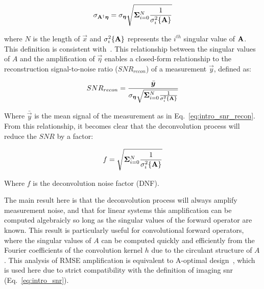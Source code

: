 \begin{equation}\label{eq:intro_noise_amplification}
    \sigma_{\mathbf{A}^{\dagger}\bm{\eta}} = \sigma_{\bm{\eta}} \sqrt{\mathbf{\Sigma}_{i=0}^N{\frac{1}{\sigma_i^2\{\mathbf{A}\}}}}
\end{equation}

\noindent where $N$ is the length of $\vec{x}$ and $\sigma_i^2 \{\mathbf{A}\}$ represents the $i^{th}$ singular value of $\mathbf{A}$. This definition is consistent with~\cite{agrawal2009optimal}. This relationship between the singular values of $A$ and the amplification of $\vec{\eta}$ enables a closed-form relationship to the reconstruction signal-to-noise ratio ($SNR_{recon}$) of a measurement $\vec{y}$, defined as:

\begin{equation}\label{eq:intro_snr_recon}
SNR_{recon} = \frac{\bar{\bm{y}}}{\sigma_{\bm{\eta}} \sqrt{\mathbf{\Sigma}_{i=0}^N{\frac{1}{\sigma_i^2\{\mathbf{A}\}}}}}
\end{equation}

Where $\bar{\vec{y}}$ is the mean signal of the measurement as in Eq.~\ref{eq:intro_snr_recon}. From this relationship, it becomes clear that the deconvolution process will reduce the $SNR$ by a factor:

\begin{equation}\label{eq:intro_dnf}
    f = \sqrt{\mathbf{\Sigma}_{i=0}^N{\frac{1}{\sigma_i^2\{\mathbf{A}\}}}}
\end{equation}

Where $f$ is the deconvolution noise factor (DNF).

The main result here is that the deconvolution process will always amplify measurement noise, and that for linear systems this amplification can be computed algebraicly so long as the singular values of the forward operator are known. This result is particularly useful for convolutional forward operators, where the singular values of $A$ can be computed quickly and efficiently from the Fourier coefficients of the convolution kernel $h$ due to the circulant structure of $A$. This analysis of RMSE amplification is equivalent to A-optimal design~\cite{chernoff1953locally}, which is used here due to strict compatibility with the definition of imaging snr (Eq.~\ref{eq:intro_snr}).

